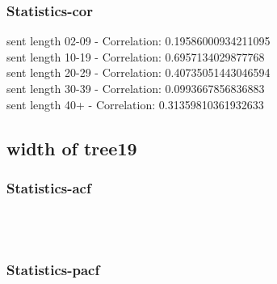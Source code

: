 \documentclass{article}%
\begin{document}
%
\newpage%
\subsubsection{Statistics{-}cor}%
\label{ssubsec:Statistics{-}cor}%
\noindent%
sent length 02-09 - Correlation: 0.19586000934211095\\%
sent length 10-19 - Correlation: 0.6957134029877768\\%
sent length 20-29 - Correlation: 0.40735051443046594\\%
sent length 30-39 - Correlation: 0.0993667856836883\\%
sent length 40+ - Correlation: 0.31359810361932633\\

%
\newpage

%
\subsection{width of tree19}%
\label{subsec:widthoftree19}%
\subsubsection{Statistics{-}acf}%
\label{ssubsec:Statistics{-}acf}%


\begin{figure}[ht]%
\centering%
\setlength{\abovecaptionskip}{-35pt}%
%
%
\\%
%
%
\\%
%
\end{figure}

%
\newpage%
\subsubsection{Statistics{-}pacf}%
\label{ssubsec:Statistics{-}pacf}%
\end{document}
